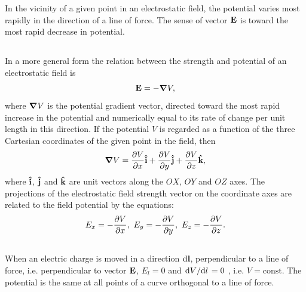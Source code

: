 In the vicinity of a given point in an electrostatic field, the potential varies most rapidly in the direction of a line of force. The sense of vector $\vb{E}$ is toward the most rapid decrease in potential.

\subsection{}\label{16.3.3}
In a more general form the relation between the strength and potential of an electrostatic field is
\begin{equation*}%
\vb{E} = -\grad{V},
\end{equation*}
where $\grad{V}$ is the potential gradient vector, directed toward the most rapid increase in the potential and numerically equal to its rate of change per unit length in this direction. If the potential $V$ is regarded as a function of the three Cartesian coordinates of the given point in the field, then
\begin{equation*}%
\grad{V} =\pdv{V}{x} \vu{i} + \pdv{V}{y} \vu{j} + \pdv{V}{z} \vu{k},
\end{equation*}
where $\vu{i}$, $\vu{j}$ and $\vu{k}$ are unit vectors along the $OX$, $OY$ and $OZ$ axes. The projections of the electrostatic field strength vector on the coordinate axes are related to the field potential by the equations:
\begin{equation*}%
E_{x} = -\pdv{V}{x},\,\,E_{y} = -\pdv{V}{y},\,\,E_{z} = -\pdv{V}{z}.
\end{equation*}

\subsection{}\label{16.3.4}
 When an electric charge is moved in a direction $\dd \vb{l}$, perpendicular to a line of force, i.e. perpendicular to vector $\vb{E}$, $E_{l} = 0$ and $\dv*{V}{l} = 0$ , i.e. $V = \text{const}$. The potential is the same at all points of a curve orthogonal to a line of force.
 
